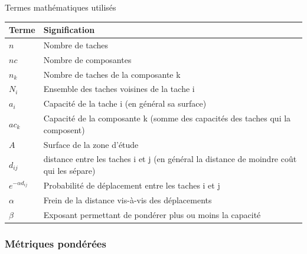 \documentclass{article}
\begin{document}
Termes mathématiques utilisés

\begin{table}[H]
\begin{tabular}{|m{3.24cm}|m{12.604cm}|}
\hline
Terme &
Signification\\\hline
$
n
$
 &
Nombre de taches\\\hline
$
\mathit{nc}
$
 &
Nombre de composantes\\\hline
$
{n}_{k}
$
 &
Nombre de taches de la composante k\\\hline
$
{N}_{i}
$
 &
Ensemble des taches voisines de la tache i\\\hline
$
{a}_{i}\text{~}
$
 &
Capacité de la tache i (en général sa surface)\\\hline
$
{\mathit{ac}}_{k}
$
 &
Capacité de la composante k (somme des capacités des taches qui la composent)\\\hline
$
A
$
 &
Surface de la zone d’étude\\\hline
$
{d}_{\mathit{ij}}\text{~}
$
 &
distance entre les taches i et j (en général la distance de moindre coût qui les sépare)\\\hline
$
{e}^{-\alpha {d}_{\mathit{ij}}}\text{~}
$
 &
Probabilité de déplacement entre les taches i et j\\\hline
$
\alpha 
$
 &
Frein de la distance vis-à-vis des déplacements\\\hline
$
\beta 
$
 &
Exposant permettant de pondérer plus ou moins la capacité\\\hline
\end{tabular}
\end{table}


\subsubsection{Métriques pondérées}
\end{document}
